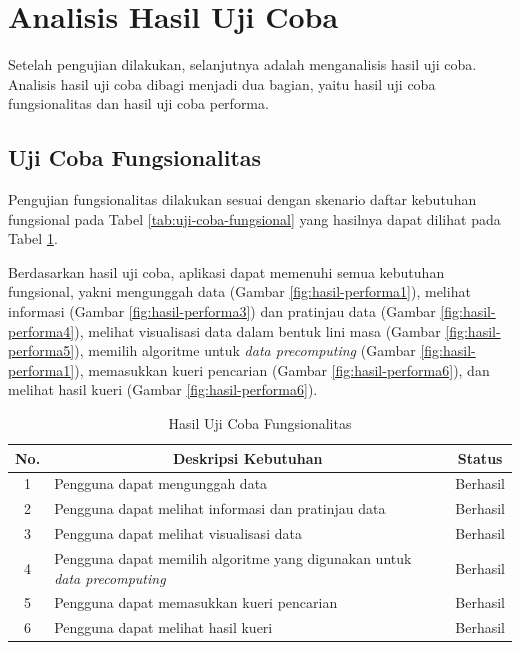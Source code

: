 \section{Analisis Hasil Uji Coba}
\tab Setelah pengujian dilakukan, selanjutnya adalah menganalisis hasil uji coba. Analisis hasil uji coba dibagi menjadi dua bagian, yaitu hasil uji coba fungsionalitas dan hasil uji coba performa.

\subsection{Uji Coba Fungsionalitas}
\tab Pengujian fungsionalitas dilakukan sesuai dengan skenario daftar kebutuhan fungsional pada Tabel \ref{tab:uji-coba-fungsional} yang hasilnya dapat dilihat pada Tabel \ref{tab:hasil-uji-coba-fungsional}. 

Berdasarkan hasil uji coba, aplikasi dapat memenuhi semua kebutuhan fungsional, yakni mengunggah data (Gambar \ref{fig:hasil-performa1}), melihat informasi (Gambar \ref{fig:hasil-performa3}) dan pratinjau data (Gambar \ref{fig:hasil-performa4}), melihat visualisasi data dalam bentuk lini masa (Gambar \ref{fig:hasil-performa5}), memilih algoritme untuk \textit{data precomputing} (Gambar \ref{fig:hasil-performa1}), memasukkan kueri pencarian (Gambar \ref{fig:hasil-performa6}), dan melihat hasil kueri (Gambar \ref{fig:hasil-performa6}).

\begin{table}[H]
	\centering
	\begin{tabular}{ | c | p{5cm} | p{2cm} | }
		\hline
		\multicolumn{1}{|c}{\textbf{No.}} & \multicolumn{1}{|c}{\textbf{Deskripsi Kebutuhan}} & \multicolumn{1}{|c|}{\textbf{Status}}\\ \hline \hline
		1 & Pengguna dapat mengunggah data & Berhasil\\ \hline
		2 & Pengguna dapat melihat informasi dan pratinjau data & Berhasil\\ \hline
		3 & Pengguna dapat melihat visualisasi data & Berhasil \\ \hline
		4 & Pengguna dapat memilih algoritme yang digunakan untuk \textit{data precomputing} & Berhasil\\ \hline
		5 & Pengguna dapat memasukkan kueri pencarian & Berhasil \\ \hline
		6 & Pengguna dapat melihat hasil kueri & Berhasil\\ \hline
	\end{tabular} \caption{Hasil Uji Coba Fungsionalitas}
	\label{tab:hasil-uji-coba-fungsional}
\end{table}

